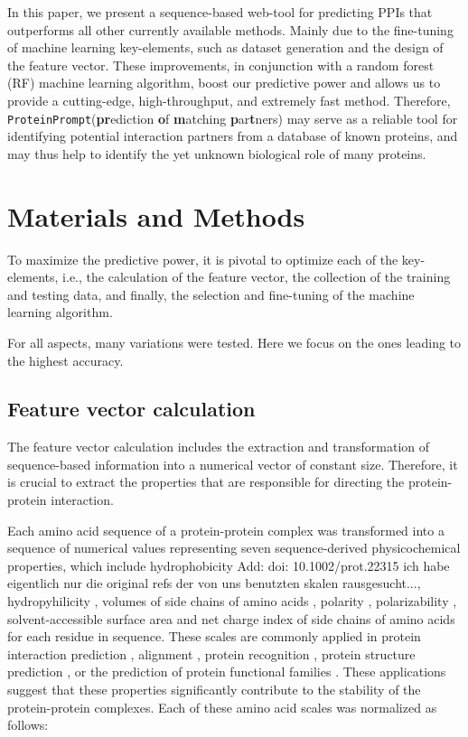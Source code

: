 \documentclass[preprint,3p,times,twocolumn]{elsarticle}
\newcommand{\TODO}[1] {\begingroup\color{red}#1\endgroup}
\newcommand{\SC}[1] {\begingroup\color{purple}#1\endgroup}
\newcommand{\tool}{\texttt{ProteinPrompt}\hspace{2pt}}
\begin{document}
In this paper, we present a sequence-based web-tool for predicting
PPIs that outperforms all other currently available methods. Mainly
due to the fine-tuning of machine learning key-elements, such as
dataset generation and the design of the feature vector. These
improvements, in conjunction with a random forest (RF) machine
learning algorithm, boost our predictive power and allows us to
provide a cutting-edge, high-throughput, and extremely fast
method. Therefore, \tool (\textbf{pr}ediction \textbf{o}f
\textbf{m}atching \textbf{p}ar\textbf{t}ners) may serve as a reliable
tool for identifying potential interaction partners from a database of
known proteins, and may thus help to identify the yet unknown
biological role of many proteins.


\section{Materials and Methods}

To maximize the predictive power, it is pivotal to optimize each of
the key-elements, i.e., the calculation of the feature vector, the
collection of the training and testing data, and finally, the
selection and fine-tuning of the machine learning algorithm. 

For all aspects, many variations were tested. Here we focus on the
ones leading to the highest accuracy. 


\subsection{Feature vector calculation}
The feature vector calculation includes the extraction and
transformation of sequence-based information into a numerical vector
of constant size. Therefore, it is crucial to extract the properties
that are responsible for directing the protein-protein interaction. 

Each amino acid sequence of a protein-protein complex was transformed
into a sequence of numerical values representing seven
sequence-derived physicochemical properties, which include
hydrophobicity \cite{Eisenberg:1984} \TODO{Add: doi:
  10.1002/prot.22315} \SC{ich habe eigentlich nur die original refs
  der von uns benutzten skalen rausgesucht...}, hydropyhilicity
\cite{Hopp:1981}, volumes of side chains of amino acids
\cite{Krigbaum:1979}, polarity \cite{Grantham:1974}, polarizability
\cite{Charton:1982}, solvent-accessible surface area \cite{Rose:1985}
and net charge index of side chains of amino acids \cite{Zhou:2006}
for each residue in sequence. These scales are commonly applied in
protein interaction prediction \cite{Bock:2001} \cite{Bock:2003},
alignment \cite{Stamm:2013}, protein recognition \cite{Ding:2001},
protein structure prediction \cite{Durham:2009}, or the prediction of
protein functional families \cite{Cai:2003}. These applications
suggest that these properties significantly contribute to the
stability of the protein-protein complexes. Each of these amino acid
scales was normalized as follows: 
\end{document}
